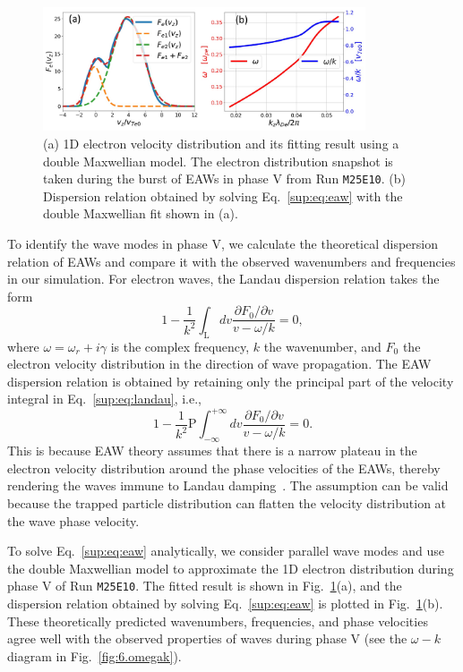 \documentclass[%
 reprint,
 amsmath,
 amssymb,
 aps,
 prx,
floatfix,
superscriptaddress
]{revtex4-2}
\begin{document}
\begin{figure}[!htbp]
  \includegraphics[width=0.85\textwidth]{Fig_app_4.pdf}
\caption{(a) 1D electron velocity distribution and its fitting result using a double Maxwellian model. The electron distribution snapshot is taken during the burst of EAWs in phase V from Run {\tt M25E10}. (b) Dispersion relation obtained by solving Eq.~\eqref{sup:eq:eaw} with the double Maxwellian fit shown in (a).}
\label{sup:fig:eaw}
\end{figure}

To identify the wave modes in phase V, we calculate the theoretical dispersion relation of EAWs and compare it with the observed wavenumbers and frequencies in our simulation.
For electron waves, the Landau dispersion relation takes the form~\cite{Landau1946}
\begin{equation}
\label{sup:eq:landau}
1-\frac{1}{k^{2}} \int_{\mathrm{L}} d v \frac{\partial F_{0} / \partial v}{v-\omega / k}=0,
\end{equation}
where $\omega = \omega_{r} + i\gamma$ is the complex frequency, $k$ the wavenumber,
and $F_0$ the electron velocity distribution in the direction of wave propagation.
The EAW dispersion relation is obtained by retaining only the principal part of the velocity integral in Eq.~\eqref{sup:eq:landau}, i.e.,
\begin{equation}
\label{sup:eq:eaw}
1-\frac{1}{k^{2}} \mathrm{P}\int_{-\infty}^{+ \infty} d v \frac{\partial F_{0} / \partial v}{v-\omega / k}=0.
\end{equation}
This is because EAW theory assumes that there is a narrow plateau in the electron velocity distribution around the phase velocities of the EAWs, thereby rendering the waves immune to Landau damping~\cite{holloway1991undamped}.
The assumption can be valid because the trapped particle distribution can flatten the velocity distribution at the wave phase velocity.

To solve Eq.~\eqref{sup:eq:eaw} analytically, we consider parallel wave modes and use the double Maxwellian model to approximate the 1D electron distribution during phase V of Run {\tt M25E10}. 
The fitted result is shown in Fig.~\ref{sup:fig:eaw}(a), and the dispersion relation obtained by solving Eq.~\eqref{sup:eq:eaw} is plotted in Fig.~\ref{sup:fig:eaw}(b).
These theoretically predicted wavenumbers, frequencies, and phase velocities agree well with the observed properties of waves during phase V (see the $\omega-k$ diagram in Fig.~\ref{fig:6.omegak}).
\end{document}
